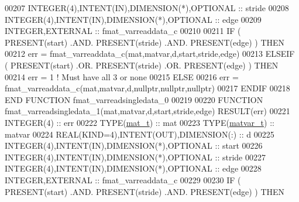 \begin{DoxyCode}
00207     \textcolor{keywordtype}{INTEGER(4)},\textcolor{keywordtype}{INTENT(IN)},\textcolor{keywordtype}{DIMENSION(*)},\textcolor{keywordtype}{OPTIONAL} :: stride
00208     \textcolor{keywordtype}{INTEGER(4)},\textcolor{keywordtype}{INTENT(IN)},\textcolor{keywordtype}{DIMENSION(*)},\textcolor{keywordtype}{OPTIONAL} :: edge
00209     \textcolor{keywordtype}{INTEGER},\textcolor{keywordtype}{EXTERNAL}                            :: fmat\_varreaddata\_c
00210 
00211     \textcolor{keywordflow}{IF} ( \textcolor{keyword}{PRESENT}(start) .AND. \textcolor{keyword}{PRESENT}(stride) .AND. \textcolor{keyword}{PRESENT}(edge) ) \textcolor{keywordflow}{THEN}
00212         err = fmat\_varreaddata\_c(mat,matvar,d,start,stride,edge)
00213     \textcolor{keywordflow}{ELSEIF} ( \textcolor{keyword}{PRESENT}(start) .OR. \textcolor{keyword}{PRESENT}(stride) .OR. \textcolor{keyword}{PRESENT}(edge) ) \textcolor{keywordflow}{THEN}
00214         err = 1    \textcolor{comment}{! Must have all 3 or none}
00215     \textcolor{keywordflow}{ELSE}
00216         err = fmat\_varreaddata\_c(mat,matvar,d,nullptr,nullptr,nullptr)
00217 \textcolor{keywordflow}{    ENDIF}
00218 \textcolor{keyword}{END FUNCTION }fmat\_varreadsingledata\_0
00219 
00220 \textcolor{keyword}{FUNCTION }fmat\_varreadsingledata\_1(mat,matvar,d,start,stride,edge) \textcolor{keyword}{RESULT}(err)
00221     \textcolor{keywordtype}{INTEGER(4)}                                  :: err
00222     \textcolor{keywordtype}{TYPE}(\hyperlink{group___m_a_t_gab0fc888f5a5d79943b16284b1f91c2e8}{mat\_t})                                 :: mat
00223     \textcolor{keywordtype}{TYPE}(\hyperlink{group___m_a_t_structmatvar__t}{matvar\_t})                              :: matvar
00224     \textcolor{keywordtype}{REAL(KIND=4)},\textcolor{keywordtype}{INTENT(OUT)},\textcolor{keywordtype}{DIMENSION(:)}       :: d
00225     \textcolor{keywordtype}{INTEGER(4)},\textcolor{keywordtype}{INTENT(IN)},\textcolor{keywordtype}{DIMENSION(*)},\textcolor{keywordtype}{OPTIONAL} :: start
00226     \textcolor{keywordtype}{INTEGER(4)},\textcolor{keywordtype}{INTENT(IN)},\textcolor{keywordtype}{DIMENSION(*)},\textcolor{keywordtype}{OPTIONAL} :: stride
00227     \textcolor{keywordtype}{INTEGER(4)},\textcolor{keywordtype}{INTENT(IN)},\textcolor{keywordtype}{DIMENSION(*)},\textcolor{keywordtype}{OPTIONAL} :: edge
00228     \textcolor{keywordtype}{INTEGER},\textcolor{keywordtype}{EXTERNAL}                            :: fmat\_varreaddata\_c
00229 
00230     \textcolor{keywordflow}{IF} ( \textcolor{keyword}{PRESENT}(start) .AND. \textcolor{keyword}{PRESENT}(stride) .AND. \textcolor{keyword}{PRESENT}(edge) ) \textcolor{keywordflow}{THEN}

\end{DoxyCode}
